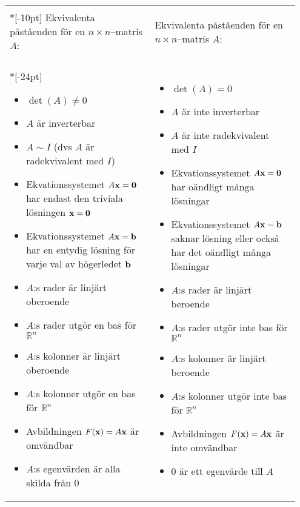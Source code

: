 \documentclass{article}
\begin{document}
\begin{tabular}{|p{0.473\linewidth}|p{0.473\linewidth}|}
  \hline
  &\\*[-10pt]
  Ekvivalenta påståenden för en $n\times n$--matris $A$:
& %
  Ekvivalenta påståenden för en $n\times n$--matris $A$:
  \\
  \hline
  \\*[-24pt]
  \begin{itemize}\addtolength{\itemsep}{-5pt}
  \item $\det(A)\ne0$
  \item $A$ är inverterbar
  \item $A\sim I$ (dvs $A$ är radekvivalent med $I$)
  \item Ekvationssystemet $A{\mathbf x}={\mathbf 0}$ har endast den triviala
    lösningen ${\mathbf x}={\mathbf 0}$
  \item Ekvationssystemet $A{\mathbf x}={\mathbf b}$ har en entydig lösning för
    varje val av högerledet ${\mathbf b}$
  \item $A$:s rader är linjärt oberoende
  \item $A$:s rader utgör en bas för $\mathbb{R}^n$
  \item $A$:s kolonner är linjärt oberoende
  \item $A$:s kolonner utgör en bas för $\mathbb{R}^n$
  \item Avbildningen $F({\mathbf x})=A{\mathbf x}$ är omvändbar %
  \item $A$:s egenvärden är alla skilda från $0$
  \end{itemize}
  \vspace{-16pt}
  &
  \begin{itemize}\addtolength{\itemsep}{-5pt}
  \item $\det(A)=0$
  \item $A$ är inte inverterbar
  \item $A$ är inte radekvivalent med $I$
  \item Ekvationssystemet $A{\mathbf x}={\mathbf 0}$ har oändligt många lösningar
  \item Ekvationssystemet $A{\mathbf x}={\mathbf b}$ saknar lösning eller också
    har det oändligt många lösningar
  \item $A$:s rader är linjärt beroende
  \item $A$:s rader utgör inte bas för $\mathbb{R}^n$
  \item $A$:s kolonner är linjärt beroende
  \item $A$:s kolonner utgör inte bas för $\mathbb{R}^n$
  \item Avbildningen $F({\mathbf x})=A{\mathbf x}$ är inte omvändbar %
  \item $0$ är ett egenvärde till $A$
  \end{itemize}
  \vspace{-16pt}
  \\
  \hline
\end{tabular}%

\label{LastPageNo}
\end{document}
